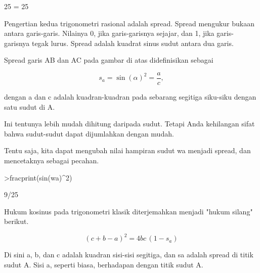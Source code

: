 \documentclass[a4paper,10pt]{article}
\begin{document}
\begin{eulernotebook}
\begin{eulercomment}
\begin{eulercomment}
\begin{eulercomment}
\begin{eulercomment}
\begin{eulercomment}
\begin{eulercomment}
\begin{eulercomment}
\begin{eulercomment}
\begin{eulercomment}
\begin{eulercomment}
\begin{eulercomment}
\begin{eulercomment}
\begin{euleroutput}
                                 25 = 25
  
\end{euleroutput}
\begin{eulercomment}
Pengertian kedua trigonometri rasional adalah spread. Spread mengukur bukaan antara
garis-garis. Nilainya 0, jika garis-garisnya sejajar, dan 1, jika garis-garisnya tegak lurus.
Spread adalah kuadrat sinus sudut antara dua garis.

Spread garis AB dan AC pada gambar di atas didefinisikan sebagai

\end{eulercomment}
\begin{eulerformula}
\[
s_a = \sin(\alpha)^2 = \frac{a}{c},
\]
\end{eulerformula}
\begin{eulercomment}
dengan a dan c adalah kuadran-kuadran pada sebarang segitiga siku-siku dengan satu sudut di A.
\end{eulercomment}
\begin{eulercomment}
Ini tentunya lebih mudah dihitung daripada sudut. Tetapi Anda kehilangan sifat bahwa
sudut-sudut dapat dijumlahkan dengan mudah.

Tentu saja, kita dapat mengubah nilai hampiran sudut wa menjadi spread, dan mencetaknya
sebagai pecahan.
\end{eulercomment}
\begin{eulerprompt}
>fracprint(sin(wa)^2)
\end{eulerprompt}
\begin{euleroutput}
  9/25
\end{euleroutput}
\begin{eulercomment}
Hukum kosinus pada trigonometri klasik diterjemahkan menjadi "hukum silang" berikut.

\end{eulercomment}
\begin{eulerformula}
\[
(c+b-a)^2 = 4 b c \, (1-s_a)
\]
\end{eulerformula}
\begin{eulercomment}
Di sini a, b, dan c adalah kuadran sisi-sisi segitiga, dan sa adalah spread di titik sudut A.
Sisi a, seperti biasa, berhadapan dengan titik sudut A.


\end{eulercomment}
\end{eulercomment}
\end{eulercomment}
\end{eulercomment}
\end{eulercomment}
\end{eulercomment}
\end{eulercomment}
\end{eulercomment}
\end{eulercomment}
\end{eulercomment}
\end{eulercomment}
\end{eulercomment}
\end{eulercomment}
\end{eulernotebook}
\end{document}
